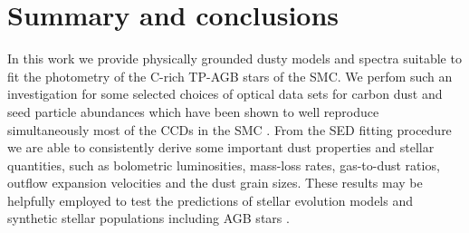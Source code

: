 \documentclass[useAMS,usenatbib]{mn2e/mn2e}
\begin{document}
{\section{Summary and conclusions}
In this work we provide physically grounded dusty models and spectra suitable to fit the photometry of the C-rich TP-AGB stars of the SMC.
We perfom such an investigation for some selected choices of optical data sets for carbon dust and seed particle abundances which have been shown to well reproduce simultaneously most of the CCDs in the SMC \citep{Nanni16}.
From the SED fitting procedure we are able to consistently derive some important dust properties and stellar quantities, such as  bolometric luminosities, mass-loss rates, gas-to-dust ratios,  outflow expansion velocities and the dust grain sizes.
These results may be helpfully employed to test the predictions of stellar evolution models \citep{marigoetal13, Marigo_etal16} and synthetic stellar populations including AGB stars \citep{Marigo_etal17}.

}
\end{document}
